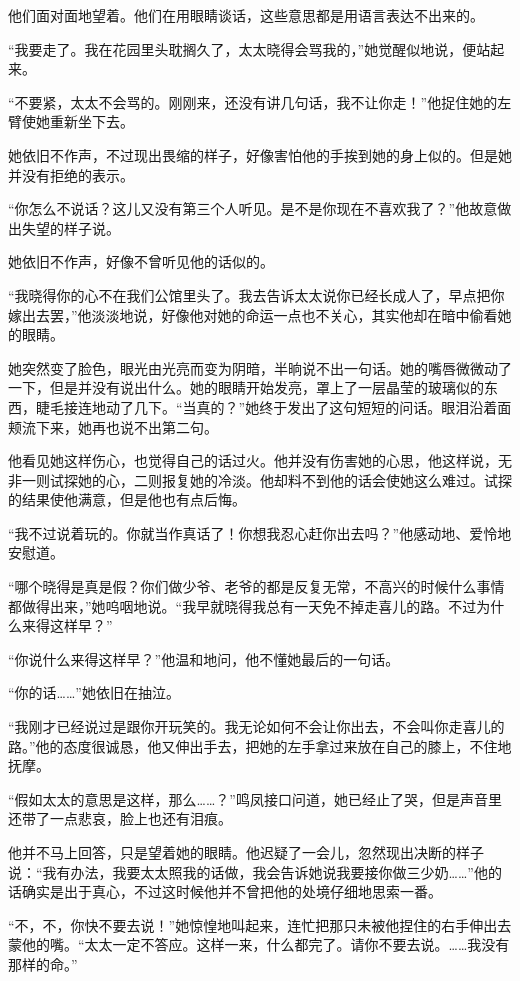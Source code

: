 \par 他们面对面地望着。他们在用眼睛谈话，这些意思都是用语言表达不出来的。
\par “我要走了。我在花园里头耽搁久了，太太晓得会骂我的，”她觉醒似地说，便站起来。
\par “不要紧，太太不会骂的。刚刚来，还没有讲几句话，我不让你走！”他捉住她的左臂使她重新坐下去。
\par 她依旧不作声，不过现出畏缩的样子，好像害怕他的手挨到她的身上似的。但是她并没有拒绝的表示。
\par “你怎么不说话？这儿又没有第三个人听见。是不是你现在不喜欢我了？”他故意做出失望的样子说。
\par 她依旧不作声，好像不曾听见他的话似的。
\par “我晓得你的心不在我们公馆里头了。我去告诉太太说你已经长成人了，早点把你嫁出去罢，”他淡淡地说，好像他对她的命运一点也不关心，其实他却在暗中偷看她的眼睛。
\par 她突然变了脸色，眼光由光亮而变为阴暗，半晌说不出一句话。她的嘴唇微微动了一下，但是并没有说出什么。她的眼睛开始发亮，罩上了一层晶莹的玻璃似的东西，睫毛接连地动了几下。“当真的？”她终于发出了这句短短的问话。眼泪沿着面颊流下来，她再也说不出第二句。
\par 他看见她这样伤心，也觉得自己的话过火。他并没有伤害她的心思，他这样说，无非一则试探她的心，二则报复她的冷淡。他却料不到他的话会使她这么难过。试探的结果使他满意，但是他也有点后悔。
\par “我不过说着玩的。你就当作真话了！你想我忍心赶你出去吗？”他感动地、爱怜地安慰道。
\par “哪个晓得是真是假？你们做少爷、老爷的都是反复无常，不高兴的时候什么事情都做得出来，”她呜咽地说。“我早就晓得我总有一天免不掉走喜儿的路。不过为什么来得这样早？”
\par “你说什么来得这样早？”他温和地问，他不懂她最后的一句话。
\par “你的话……”她依旧在抽泣。
\par “我刚才已经说过是跟你开玩笑的。我无论如何不会让你出去，不会叫你走喜儿的路。”他的态度很诚恳，他又伸出手去，把她的左手拿过来放在自己的膝上，不住地抚摩。
\par “假如太太的意思是这样，那么……？”鸣凤接口问道，她已经止了哭，但是声音里还带了一点悲哀，脸上也还有泪痕。
\par 他并不马上回答，只是望着她的眼睛。他迟疑了一会儿，忽然现出决断的样子说：“我有办法，我要太太照我的话做，我会告诉她说我要接你做三少奶……”他的话确实是出于真心，不过这时候他并不曾把他的处境仔细地思索一番。
\par “不，不，你快不要去说！”她惊惶地叫起来，连忙把那只未被他捏住的右手伸出去蒙他的嘴。“太太一定不答应。这样一来，什么都完了。请你不要去说。……我没有那样的命。”
